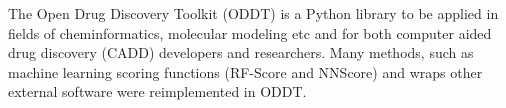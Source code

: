 The Open Drug Discovery Toolkit (ODDT) is a Python library to be applied in fields of cheminformatics, molecular modeling etc and for both computer aided drug discovery (CADD) developers and researchers. Many methods, such as machine learning scoring functions (RF-Score and NNScore) and wraps other external software were reimplemented in ODDT\cite{W_jcikowski_2015}. 